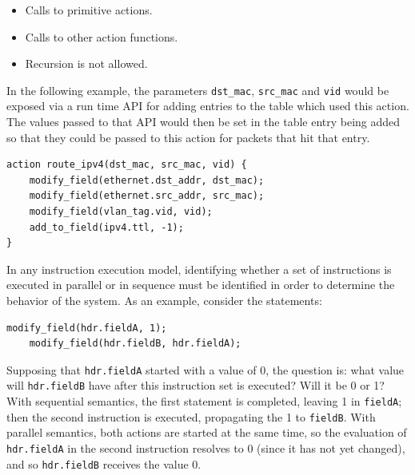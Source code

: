 \documentclass[12pt]{article}
\begin{document}
\begin{itemize}
\item
Calls to primitive actions.
\item
Calls to other action functions.
\end{itemize}

\begin{itemize}
\item
Recursion is not allowed.
\end{itemize}


In the following example, the parameters \texttt{dst_mac}, \texttt{src_mac} and \texttt{vid} would 
be exposed via a run time API for adding entries to the table which used this 
action. The values passed to that API would then be set in the table entry 
being added so that they could be passed to this action for packets that hit 
that entry.

\begin{lstlisting}[keywords={},frame=single,escapechar=\@]
action route_ipv4(dst_mac, src_mac, vid) {
    modify_field(ethernet.dst_addr, dst_mac);
    modify_field(ethernet.src_addr, src_mac);
    modify_field(vlan_tag.vid, vid);
    add_to_field(ipv4.ttl, -1);
}
\end{lstlisting}


In any instruction execution model, identifying whether a set of instructions 
is executed in parallel or in sequence must be identified in order to determine 
the behavior of the system. As an example, consider the statements:

\begin{lstlisting}[keywords={},frame=single,escapechar=\@]
    modify_field(hdr.fieldA, 1);
    modify_field(hdr.fieldB, hdr.fieldA);
\end{lstlisting}


Supposing that \texttt{hdr.fieldA} started with a value of 0, the question is: what 
value will \texttt{hdr.fieldB} have after this instruction set is executed? Will 
it be 0 or 1? With sequential semantics, the first statement is completed, 
leaving 1 in \texttt{fieldA}; then the second instruction is executed, propagating 
the 1 to \texttt{fieldB}.  With parallel semantics, both actions are started at the 
same time, so the evaluation of \texttt{hdr.fieldA} in the second instruction resolves 
to 0 (since it has not yet changed), and so \texttt{hdr.fieldB} receives the value 
0.
\end{document}

